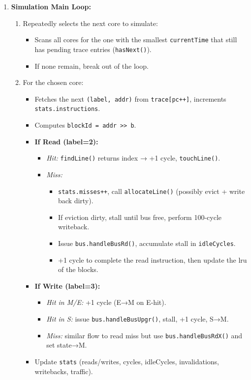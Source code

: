 \documentclass{article}
\begin{document}
\begin{itemize}
\begin{enumerate}
  \item \textbf{Simulation Main Loop:}
    \begin{enumerate}
      \item Repeatedly selects the next core to simulate:
        \begin{itemize}
          \item Scans all cores for the one with the smallest \texttt{currentTime} that still has pending trace entries (\texttt{hasNext()}).
          \item If none remain, break out of the loop.
        \end{itemize}
      \item For the chosen core:
        \begin{itemize}
          \item Fetches the next \texttt{(label, addr)} from \texttt{trace[pc++]}, increments \texttt{stats.instructions}.
          \item Computes \texttt{blockId = addr >> b}.
          \item \textbf{If Read (label=2):}
            \begin{itemize}
              \item \emph{Hit:} \texttt{findLine()} returns index → +1 cycle, \texttt{touchLine()}.
              \item \emph{Miss:}
                \begin{itemize}
                  \item \texttt{stats.misses++}, call \texttt{allocateLine()} (possibly evict + write back dirty).
                  \item If eviction dirty, stall until bus free, perform 100-cycle writeback.
                  \item Issue \texttt{bus.handleBusRd()}, accumulate stall in \texttt{idleCycles}.
                  \item +1 cycle to complete the read instruction, then  update the lru of the blocks.
                \end{itemize}
            \end{itemize}
          \item \textbf{If Write (label=3):}
            \begin{itemize}
              \item \emph{Hit in M/E:} +1 cycle (E→M on E‐hit).
              \item \emph{Hit in S:} issue \texttt{bus.handleBusUpgr()}, stall, +1 cycle, S→M.
              \item \emph{Miss:} similar flow to read miss but use \texttt{bus.handleBusRdX()} and set state→M.
            \end{itemize}
          \item Update \texttt{stats} (reads/writes, cycles, idleCycles, invalidations, writebacks, traffic).
        \end{itemize}
    \end{enumerate}


\end{enumerate}
\end{itemize}
\end{document}
